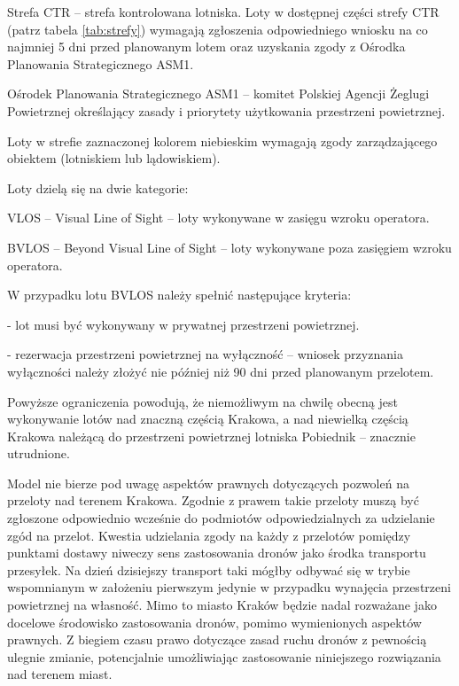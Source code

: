 \documentclass[twoside, 12pt]{article}
\begin{document}
\par Strefa CTR – strefa kontrolowana lotniska. Loty w dostępnej części strefy CTR (patrz tabela \ref{tab:strefy}) wymagają zgłoszenia odpowiedniego wniosku na co najmniej 5 dni przed planowanym lotem oraz uzyskania zgody z Ośrodka Planowania Strategicznego ASM1.
\par Ośrodek Planowania Strategicznego ASM1 – komitet Polskiej Agencji Żeglugi Powietrznej określający zasady i priorytety użytkowania przestrzeni powietrznej.
\par Loty w strefie zaznaczonej kolorem niebieskim wymagają zgody zarządzającego obiektem (lotniskiem lub lądowiskiem). 
\par Loty dzielą się na dwie kategorie:
\par VLOS – Visual Line of Sight – loty wykonywane w zasięgu wzroku operatora.
\par BVLOS – Beyond Visual Line of Sight – loty wykonywane poza zasięgiem wzroku operatora.
\par W przypadku lotu BVLOS należy spełnić następujące kryteria:
\par - lot musi być wykonywany w prywatnej przestrzeni powietrznej.
\par - rezerwacja przestrzeni powietrznej na wyłączność – wniosek przyznania wyłączności należy złożyć nie później niż 90 dni przed planowanym przelotem.
\par Powyższe ograniczenia powodują, że niemożliwym na chwilę obecną jest wykonywanie lotów nad znaczną częścią Krakowa, a nad niewielką częścią Krakowa należącą do przestrzeni powietrznej lotniska Pobiednik – znacznie utrudnione.
\par Model nie bierze pod uwagę aspektów prawnych dotyczących pozwoleń na przeloty nad terenem Krakowa. Zgodnie z prawem takie przeloty muszą być zgłoszone odpowiednio wcześnie do podmiotów odpowiedzialnych za udzielanie zgód na przelot. Kwestia udzielania zgody na każdy z przelotów pomiędzy punktami dostawy niweczy sens zastosowania dronów jako środka transportu przesyłek. Na dzień dzisiejszy transport taki mógłby odbywać się w trybie wspomnianym w założeniu pierwszym jedynie w przypadku wynajęcia przestrzeni powietrznej na własność. Mimo to miasto Kraków będzie nadal rozważane jako docelowe środowisko zastosowania dronów, pomimo wymienionych aspektów prawnych. Z biegiem czasu prawo dotyczące zasad ruchu dronów z pewnością ulegnie zmianie, potencjalnie umożliwiając zastosowanie niniejszego rozwiązania nad terenem miast.
\end{document}
